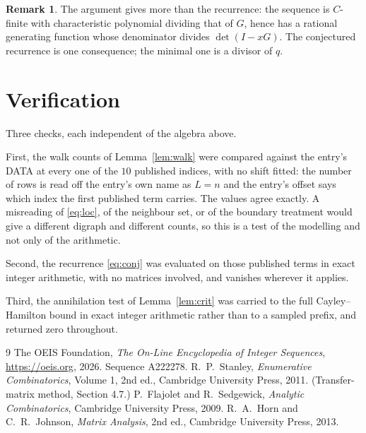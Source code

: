 \documentclass[11pt,a4paper]{article}
\theoremstyle{plain}
\theoremstyle{definition}
\newtheorem{remark}[theorem]{Remark}
\begin{document}
\begin{remark}
The argument gives more than the recurrence: the sequence is $C$-finite with characteristic
polynomial dividing that of $G$, hence has a rational generating function whose denominator
divides $\det(I-xG)$. The conjectured recurrence is one consequence; the minimal one is a
divisor of $q$.
\end{remark}

\section{Verification}

Three checks, each independent of the algebra above.

First, the walk counts of Lemma~\ref{lem:walk} were compared against the entry's DATA at
every one of the $10$ published indices, with no shift fitted: the number of rows is
read off the entry's own name as $L=n$ and the entry's offset says which index the first
published term carries. The values agree exactly. A misreading of \eqref{eq:loc}, of the
neighbour set, or of the boundary treatment would give a different digraph and different
counts, so this is a test of the modelling and not only of the arithmetic.

Second, the recurrence \eqref{eq:conj} was evaluated on those published terms in exact
integer arithmetic, with no matrices involved, and vanishes wherever it applies.

Third, the annihilation test of Lemma~\ref{lem:crit} was carried to the full
Cayley--Hamilton bound in exact integer arithmetic rather than to a sampled prefix, and
returned zero throughout.

\begin{thebibliography}{9}
 The OEIS Foundation, \emph{The On-Line Encyclopedia of Integer
Sequences}, \url{https://oeis.org}, 2026. Sequence A222278.
 R.~P.~Stanley, \emph{Enumerative Combinatorics}, Volume 1, 2nd ed.,
Cambridge University Press, 2011. (Transfer-matrix method, Section 4.7.)
 P.~Flajolet and R.~Sedgewick, \emph{Analytic Combinatorics}, Cambridge
University Press, 2009.
 R.~A.~Horn and C.~R.~Johnson, \emph{Matrix Analysis}, 2nd ed., Cambridge
University Press, 2013.
\end{thebibliography}
\end{document}
